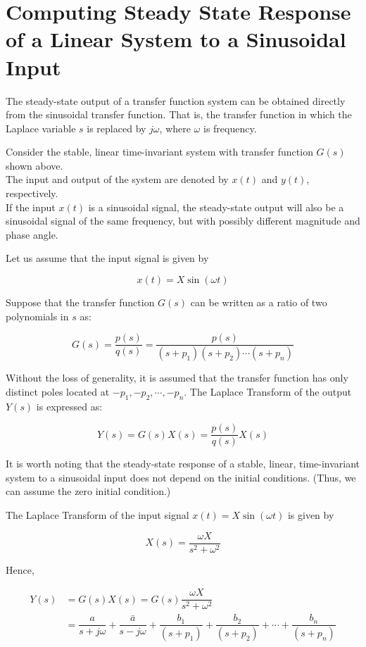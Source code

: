 \documentclass[
  14pt,
  a4paper,
  oneside,
  open=any,
  a4paper,
  14pt]{report}
\begin{document}
\section{Computing Steady State Response of a Linear System to a
Sinusoidal
Input}\label{computing-steady-state-response-of-a-linear-system-to-a-sinusoidal-input}

The steady-state output of a transfer function system can be obtained
directly from the sinusoidal transfer function. That is, the transfer
function in which the Laplace variable \(s\) is replaced by \(j\omega\),
where \(\omega\) is frequency.

Consider the stable, linear time-invariant system with transfer function
\(G(s)\) shown above.\\
The input and output of the system are denoted by \(x(t)\) and \(y(t)\),
respectively.\\
If the input \(x(t)\) is a sinusoidal signal, the steady-state output
will also be a sinusoidal signal of the same frequency, but with
possibly different magnitude and phase angle.

Let us assume that the input signal is given by

\[
    x(t) = X \sin(\omega t)
\]

Suppose that the transfer function \(G(s)\) can be written as a ratio of
two polynomials in \(s\) as:

\[
    G(s) = \dfrac{p(s)}{q(s)} = \dfrac{p(s)}{(s+p_1)(s+p_2)\cdots(s+p_n)}
\]

Without the loss of generality, it is assumed that the transfer function
has only distinct poles located at \(-p_1, -p_2, \cdots, -p_n\). The
Laplace Transform of the output \(Y(s)\) is expressed as:

\[
    Y(s) = G(s)X(s) = \dfrac{p(s)}{q(s)}X(s)
\]

It is worth noting that the steady-state response of a stable, linear,
time-invariant system to a sinusoidal input does not depend on the
initial conditions. (Thus, we can assume the zero initial condition.)

The Laplace Transform of the input signal \(x(t) = X \sin(\omega t)\) is
given by

\[
    X(s) = \dfrac{\omega X}{s^2 + \omega^2}
\]

Hence,

\[
\begin{aligned}
    Y(s) &= G(s)X(s) = G(s)\dfrac{\omega X}{s^2 + \omega^2} \\
    &= \dfrac{a}{s+j\omega} + \dfrac{\bar{a}}{s-j\omega} + \dfrac{b_1}{(s+p_1)} + \dfrac{b_2}{(s+p_2)} + \cdots + \dfrac{b_n}{(s+p_n)} 
\end{aligned}
\]
\end{document}
